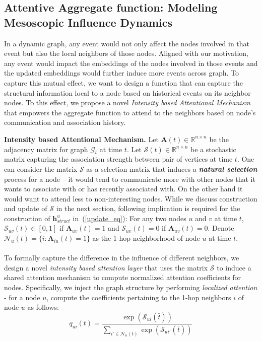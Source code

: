 \documentclass[11pt]{article}
\begin{document}
\subsection{Attentive Aggregate function: Modeling Mesoscopic Influence Dynamics}
\vspace{-2mm}
In a dynamic graph, any event would not only affect the nodes involved in that event but also the local neighbors of those nodes. Aligned with our motivation, any event would impact the embeddings of the nodes involved in those events and the updated embeddings would further induce more events across graph. To capture this mutual effect, we want to design a function that can capture the structural information local to a node based on historical events on its neighbor nodes. To this effect, we propose a novel \textit{Intensity based Attentional Mechanism} that empowers the aggregate function to attend to the neighbors based on node's communication and association history.

{\bf Intensity based Attentional Mechanism.} Let $\mathbf{A}(t) \in \mathbb{R}^{n \times n}$ be the adjacency matrix for graph $\mathcal{G}_t$ at time $t$. Let $\mathcal{S}(t) \in \mathbb{R}^{n \times n}$ be a stochastic matrix capturing the association strength between pair of vertices at time $t$. One can consider the matrix $\mathcal{S}$ as a selection matrix that induces a \textbf{\textit{natural selection}} process for a node -- it would tend to communicate more with other nodes that it wants to associate with or has recently associated with. On the other hand it would want to attend less to non-interesting nodes.
While we discuss construction and update of $\mathcal{S}$ in the next section, following implication is required for the construction of $\mathbf{h}^u_{struct}$ in~(\ref{update_eq}): For any two nodes $u$ and $v$ at time $t$,  $\mathcal{S}_{uv}(t) \in [0,1]$ if $\mathbf{A}_{uv}(t) = 1$ and $\mathcal{S}_{uv}(t) = 0$ if $\mathbf{A}_{uv}(t) = 0$. Denote $\mathcal{N}_u(t) = \{i: \mathbf{A}_{iu}(t) = 1\}$ as the 1-hop neighborhood of node $u$ at time $t$.\\\\
To formally capture the difference in the influence of different neighbors, we design a novel \textit{intensity based attention layer} that uses the matrix $\mathcal{S}$ to induce a shared attention mechanism to compute normalized attention coefficients for nodes. Specifically, we inject the graph structure by performing \emph{localized attention} - for a node $u$, compute the coefficients pertaining to the 1-hop neighbors $i$ of node $u$ as follows:
\begin{equation}\label{attend}
q_{ui}(t) = \frac{\exp(\mathcal{S}_{ui}(\bar{t}))}{\sum_{i' \in \mathcal{N}_u(t)}\exp(\mathcal{S}_{ui'}(\bar{t}))}
\end{equation}
\end{document}
